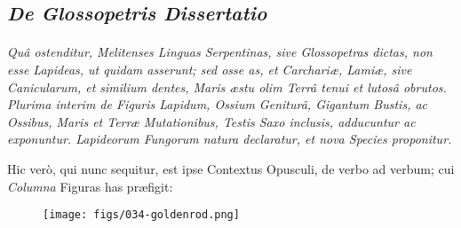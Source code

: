 \documentclass[a4paper, 11pt, oneside, polutonikogreek, german]{article}
\begin{document}
\subsection{\emph{De Glossopetris Dissertatio}}
\paragraph{}
\emph{Quâ ostenditur, Melitenses Linguas Serpentinas, sive Glossopetras dictas, non esse Lapideas, ut quidam asserunt; sed osse
as, et Carchariæ, Lamiæ, sive Canicularum, et similium dentes, Maris æstu olim Terrâ tenui et lutosâ obrutos. Plurima interim de Figuris Lapidum, Ossium Geniturâ, Gigantum Bustis, ac Ossibus, Maris et Terræ Mutationibus, Testis Saxo inclusis, adducuntur ac exponuntur. Lapideorum Fungorum natura declaratur, et nova Species proponitur.}

Hic verò, qui nunc sequitur, est ipse Contextus Opusculi, de verbo ad verbum; cui \emph{Columna} Figuras has præfigit:

\begin{figure}[H]
\centering
\texttt{[image: figs/034-goldenrod.png]}
\end{figure}
\end{document}
